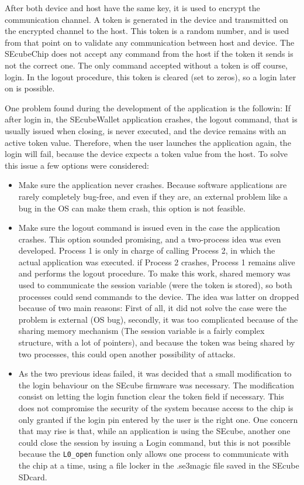 After both device and host have the same key, it is used to encrypt the communication channel. A token is generated in the device and transmitted on the encrypted channel to the host. This token is a random number, and is used from that point on to validate any communication between host and device. The SEcubeChip does not accept any command from the host if the token it sends is not the correct one. The only command accepted without a token is off course, login. In the logout procedure, this token is cleared (set to zeros), so a login later on is possible.

One problem found during the development of the application is the followin: If after login in, the SEcubeWallet application crashes, the logout command, that is usually issued when closing, is never executed, and the device remains with an active token value. Therefore, when the user launches the application again, the login will fail, because the device expects a token value from the host. To solve this issue a few options were considered:

\begin{itemize}
\setlength\itemsep{0pt}
\item Make sure the application never crashes. Because software applications are rarely completely bug-free, and even if they are, an external problem like a bug in the OS can make them crash, this option is not feasible. 
\item Make sure the logout command is issued even in the case the application crashes. This option sounded promising, and a two-process idea was even developed. Process 1 is only in charge of calling Process 2, in which the actual application was executed. if Process 2 crashes, Process 1 remains alive and performs the logout procedure. To make this work, shared memory was used to communicate the session variable (were the token is stored), so both processes could send commands to the device. The idea was latter on dropped because of two main reasons: First of all, it did not solve the case were the problem is external (OS bug), secondly, it was too complicated because of the sharing memory mechanism (The session variable is a fairly complex structure, with a lot of pointers), and because the token was being shared by two processes, this could open another possibility of attacks.
\item As the two previous ideas failed, it was decided that a small modification to the login behaviour on the SEcube firmware was necessary. The modification consist on letting the login function clear the token field if necessary. This does not compromise the security of the system because access to the chip is only granted if the login pin entered by the user is the right one. One concern that may rise is that, while an application is using the SEcube, another one could close the session by issuing a Login command, but this is not possible because the \texttt{L0\_open} function only allows one process to communicate with the chip at a time, using a file locker in the .se3magic
file saved in the SEcube SDcard.
\end{itemize} 

